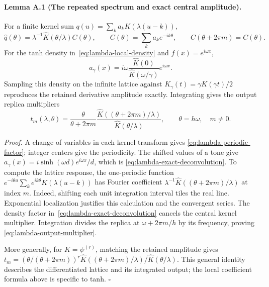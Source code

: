 \documentclass[11pt]{article}
\begin{document}
\paragraph{Lemma A.1 (The repeated spectrum and exact central amplitude).}
For a finite kernel sum $q(u)=\sum_ka_kK(\lambda(u-k))$,
\begin{equation}
 \widehat q(\theta)=\lambda^{-1}\widehat K(\theta/\lambda)C(\theta),
 \qquad C(\theta)=\sum_ka_ke^{-ik\theta},\qquad
 C(\theta+2\pi m)=C(\theta).
 \label{eq:lambda-periodic-factor}
\end{equation}
For the tanh density in~\eqref{eq:lambda-local-density} and
$f(x)=e^{i\omega x}$,
\begin{equation}
 a_\gamma(x)=i\omega\frac{\widehat K(0)}{\widehat K(\omega/\gamma)}e^{i\omega x}.
 \label{eq:lambda-exact-deconvolution}
\end{equation}
Sampling this density on the infinite lattice against
$K_\gamma(t)=\gamma K(\gamma t)/2$ reproduces the retained derivative
amplitude exactly. Integrating gives the output replica multipliers
\begin{equation}
 t_m(\lambda,\theta)=
 \frac{\theta}{\theta+2\pi m}
 \frac{\widehat K((\theta+2\pi m)/\lambda)}{\widehat K(\theta/\lambda)},
 \qquad \theta=h\omega,\quad m\ne0.
 \label{eq:lambda-output-multiplier}
\end{equation}

\emph{Proof.}
A change of variables in each kernel transform gives
\eqref{eq:lambda-periodic-factor}; integer centers give the periodicity.
The shifted values of a tone give
$a_\gamma(x)=i\sinh(\omega d)e^{i\omega x}/d$, which is
\eqref{eq:lambda-exact-deconvolution}. To compute the lattice response,
the one-periodic function
$e^{-i\theta u}\sum_ke^{ik\theta}K(\lambda(u-k))$ has Fourier
coefficient $\lambda^{-1}\widehat K((\theta+2\pi m)/\lambda)$ at index $m$.
Indeed, shifting each unit integration interval tiles the real line.
Exponential localization justifies this calculation and the convergent
series. The density factor in~\eqref{eq:lambda-exact-deconvolution}
cancels the central kernel multiplier. Integration divides the replica
at $\omega+2\pi m/h$ by its frequency, proving
\eqref{eq:lambda-output-multiplier}.

More generally, for $K=\psi^{(r)}$, matching the retained amplitude gives
$t_m=(\theta/(\theta+2\pi m))^r
\widehat K((\theta+2\pi m)/\lambda)/\widehat K(\theta/\lambda)$.
This general identity describes the differentiated lattice and its
integrated output; the local coefficient formula above is specific to tanh.
\hfill$\square$
\end{document}
